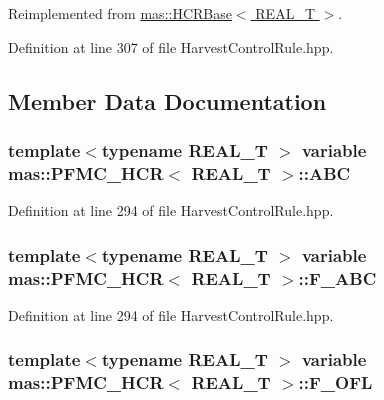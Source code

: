 Reimplemented from \hyperlink{structmas_1_1_h_c_r_base_a3f1aa4335bee8d9225776ca5212e1085}{mas\-::\-H\-C\-R\-Base$<$ R\-E\-A\-L\-\_\-\-T $>$}.



Definition at line 307 of file Harvest\-Control\-Rule.\-hpp.



\subsection{Member Data Documentation}
\hypertarget{structmas_1_1_p_f_m_c___h_c_r_aeb488a01a83c2ad95756e8904ce5d76b}{
\subsubsection[{A\-B\-C}]{\setlength{\rightskip}{0pt plus 5cm}template$<$typename R\-E\-A\-L\-\_\-\-T $>$ {\bf variable} {\bf mas\-::\-P\-F\-M\-C\-\_\-\-H\-C\-R}$<$ R\-E\-A\-L\-\_\-\-T $>$\-::A\-B\-C}}\label{structmas_1_1_p_f_m_c___h_c_r_aeb488a01a83c2ad95756e8904ce5d76b}


Definition at line 294 of file Harvest\-Control\-Rule.\-hpp.

\hypertarget{structmas_1_1_p_f_m_c___h_c_r_a9ef690cc5957f768d4ac4924bde499df}{
\subsubsection[{F\-\_\-\-A\-B\-C}]{\setlength{\rightskip}{0pt plus 5cm}template$<$typename R\-E\-A\-L\-\_\-\-T $>$ {\bf variable} {\bf mas\-::\-P\-F\-M\-C\-\_\-\-H\-C\-R}$<$ R\-E\-A\-L\-\_\-\-T $>$\-::F\-\_\-\-A\-B\-C}}\label{structmas_1_1_p_f_m_c___h_c_r_a9ef690cc5957f768d4ac4924bde499df}


Definition at line 294 of file Harvest\-Control\-Rule.\-hpp.

\hypertarget{structmas_1_1_p_f_m_c___h_c_r_a5804d2123da3f0ec617ad3f559920c9f}{
\subsubsection[{F\-\_\-\-O\-F\-L}]{\setlength{\rightskip}{0pt plus 5cm}template$<$typename R\-E\-A\-L\-\_\-\-T $>$ {\bf variable} {\bf mas\-::\-P\-F\-M\-C\-\_\-\-H\-C\-R}$<$ R\-E\-A\-L\-\_\-\-T $>$\-::F\-\_\-\-O\-F\-L}}\label{structmas_1_1_p_f_m_c___h_c_r_a5804d2123da3f0ec617ad3f559920c9f}


